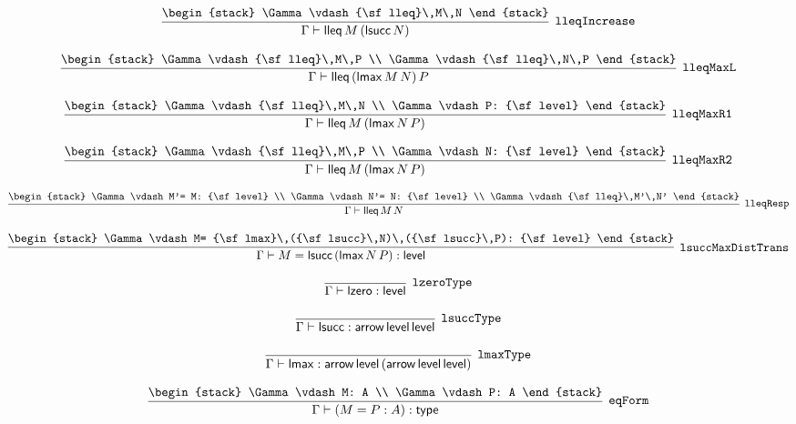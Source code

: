 \[
\infer[{\tt lleqIncrease}]{\Gamma \vdash {\sf lleq}\,M\,({\sf lsucc}\,N)}{
\begin{stack}
\Gamma \vdash {\sf lleq}\,M\,N
\end{stack}}
\]

\[
\infer[{\tt lleqMaxL}]{\Gamma \vdash {\sf lleq}\,({\sf lmax}\,M\,N)\,P}{
\begin{stack}
\Gamma \vdash {\sf lleq}\,M\,P
\\
\Gamma \vdash {\sf lleq}\,N\,P
\end{stack}}
\]

\[
\infer[{\tt lleqMaxR1}]{\Gamma \vdash {\sf lleq}\,M\,({\sf lmax}\,N\,P)}{
\begin{stack}
\Gamma \vdash {\sf lleq}\,M\,N
\\
\Gamma \vdash P: {\sf level}
\end{stack}}
\]

\[
\infer[{\tt lleqMaxR2}]{\Gamma \vdash {\sf lleq}\,M\,({\sf lmax}\,N\,P)}{
\begin{stack}
\Gamma \vdash {\sf lleq}\,M\,P
\\
\Gamma \vdash N: {\sf level}
\end{stack}}
\]

\[
\infer[{\tt lleqResp}]{\Gamma \vdash {\sf lleq}\,M\,N}{
\begin{stack}
\Gamma \vdash M'= M: {\sf level}
\\
\Gamma \vdash N'= N: {\sf level}
\\
\Gamma \vdash {\sf lleq}\,M'\,N'
\end{stack}}
\]

\[
\infer[{\tt lsuccMaxDistTrans}]{\Gamma \vdash M= {\sf lsucc}\,({\sf lmax}\,N\,P): {\sf level}}{
\begin{stack}
\Gamma \vdash M= {\sf lmax}\,({\sf lsucc}\,N)\,({\sf lsucc}\,P): {\sf level}
\end{stack}}
\]

\[
\infer[{\tt lzeroType}]{\Gamma \vdash {\sf lzero}: {\sf level}}{}
\]

\[
\infer[{\tt lsuccType}]{\Gamma \vdash {\sf lsucc}: {\sf arrow}\,{\sf level}\,{\sf level}}{}
\]

\[
\infer[{\tt lmaxType}]{\Gamma \vdash {\sf lmax}: {\sf arrow}\,{\sf level}\,({\sf arrow}\,{\sf level}\,{\sf level})}{}
\]

\[
\infer[{\tt eqForm}]{\Gamma \vdash (M= P: A): {\sf type}}{
\begin{stack}
\Gamma \vdash M: A
\\
\Gamma \vdash P: A
\end{stack}}
\]

